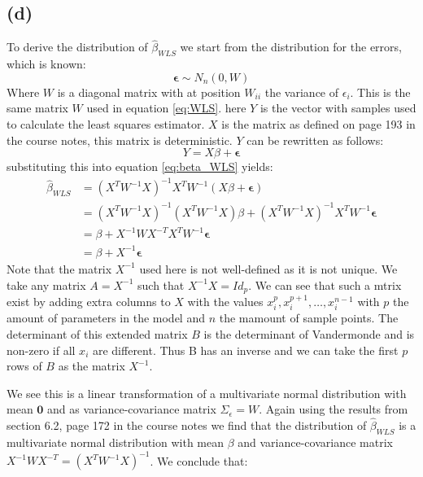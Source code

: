 \documentclass[a4paper]{article}
\begin{document}
\subsection*{(d)}
\noindent {}

To derive the distribution of $\hat{\beta}_{WLS}$ we start from the distribution for the errors, which is known:
\begin{equation*}
	\mathbf{\epsilon} \sim N_n(0, W)
\end{equation*}
Where $W$ is a diagonal matrix with at position $W_{ii}$ the variance of $\epsilon_i$. This is the same matrix $W$ used in equation \ref{eq:WLS}. here $Y$ is the vector with samples used to calculate the least squares estimator. $X$ is the matrix as defined on page 193 in the course notes, this matrix is deterministic. $Y$ can be rewritten as follows:
\begin{equation*}
	Y = X \beta + \mathbf{\epsilon}
\end{equation*}
substituting this into equation \ref{eq:beta_WLS} yields:
\begin{align*}
	\hat{\beta}_{WLS} &= (X^TW^{-1}X)^{-1} X^TW^{-1}(X\beta+\mathbf{\epsilon})\\
			  &= (X^TW^{-1}X)^{-1} (X^TW^{-1}X) \beta + (X^TW^{-1}X)^{-1} X^TW^{-1}\mathbf{\epsilon}\\
			  &= \beta + X^{-1} W X^{-T} X^T W^{-1} \mathbf{\epsilon}\\
			  &= \beta + X^{-1} \mathbf{\epsilon} 
\end{align*}
Note that the matrix $X^{-1}$ used here is not well-defined as it is not unique. We take any matrix $A=X^{-1}$ such that $X^{-1}X=Id_{p}$. We can see that such a mtrix exist by adding extra columns to $X$ with the values $x_i^p, x_i^{p+1}, \ldots, x_i^{n-1}$ with $p$ the amount of parameters in the model and $n$ the mamount of sample points. The determinant of this extended matrix $B$ is the determinant of Vandermonde and is non-zero if all $x_i$ are different. Thus B has an inverse and we can take the first $p$ rows of $B$ as the matrix $X^{-1}$.

We see this is a linear transformation of a multivariate normal distribution with mean $\mathbf{0}$ and as variance-covariance matrix $\Sigma_{\epsilon}=W$. Again using the results from section 6.2, page 172 in the course notes we find that the distribution of $\hat{\beta}_{WLS}$ is a multivariate normal distribution with mean $\beta$ and variance-covariance matrix $X^{-1} W X^{-T} = (X^T W^{-1} X)^{-1}$. We conclude that:
\end{document}
